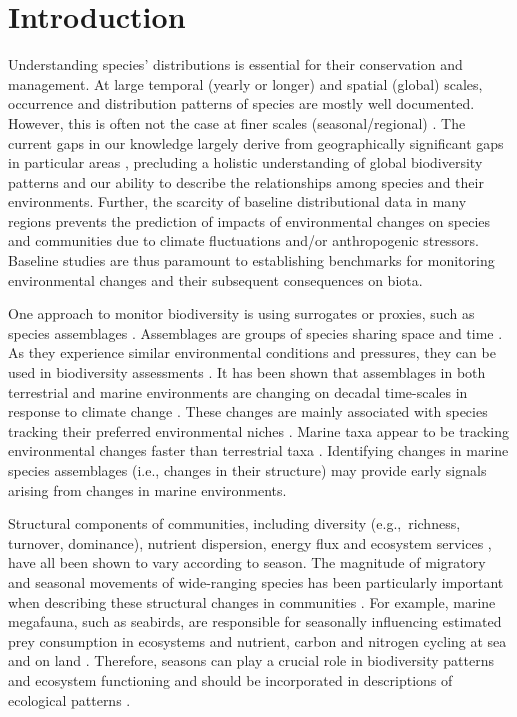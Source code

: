 \documentclass[preprint, 3p, authoryear]{elsarticle} %
\begin{document}
\newpage

\section{Introduction}

Understanding species' distributions is essential for their conservation and management. At large temporal (yearly or longer) and spatial (global) scales, occurrence and distribution patterns of species are mostly well documented. However, this is often not the case at finer scales (seasonal/regional) \citep{ferrier2002}. The current gaps in our knowledge largely derive from geographically significant gaps in particular areas \citep{miloslavich2011, hughes2021}, precluding a holistic understanding of global biodiversity patterns \citep{sastre2009} and our ability to describe the relationships among species and their environments. Further, the scarcity of baseline distributional data in many regions prevents the prediction of impacts of environmental changes on species and communities due to climate fluctuations and/or anthropogenic stressors. Baseline studies are thus paramount to establishing benchmarks for monitoring environmental changes and their subsequent consequences on biota.

One approach to monitor biodiversity is using surrogates or proxies, such as species assemblages \citep{rodrigues2007}. Assemblages are groups of species sharing space and time \citep{stroud2015}. As they experience similar environmental conditions and pressures, they can be used in biodiversity assessments \citep{ferrier2002, rodrigues2007}. It has been shown that assemblages in both terrestrial and marine environments are changing on decadal time-scales in response to climate change \citep{dornelas2014, antao2022}. These changes are mainly associated with species tracking their preferred environmental niches \citep{chen2011, pinsky2019, lenoir2020}. Marine taxa appear to be tracking environmental changes faster than terrestrial taxa \citep{pinsky2019, antao2020, lenoir2020}. Identifying changes in marine species assemblages (i.e., changes in their structure) may provide early signals arising from changes in marine environments.

Structural components of communities, including diversity (e.g.,~richness, turnover, dominance), nutrient dispersion, energy flux and ecosystem services \citep{magurran2010, bauer2014, kurasawa2024}, have all been shown to vary according to season. The magnitude of migratory and seasonal movements of wide-ranging species has been particularly important when describing these structural changes in communities \citep{bauer2014, schlagel2020}. For example, marine megafauna, such as seabirds, are responsible for seasonally influencing estimated prey consumption in ecosystems and nutrient, carbon and nitrogen cycling at sea and on land \citep{woehler1997, wing2014, doughty2016, steibl2024}. Therefore, seasons can play a crucial role in biodiversity patterns and ecosystem functioning and should be incorporated in descriptions of ecological patterns \citep{forrest2010, banks-leite2012, ponti2023}.
\end{document}
